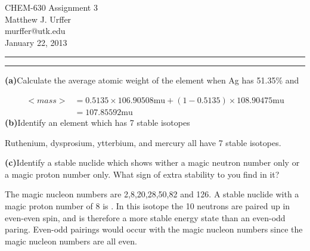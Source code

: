 \documentclass[11pt]{article}
\makeatletter
\newcommand{\question}[2] {\vspace{.25in} \hrule\vspace{0.5em}
\noindent{\bf #1: #2} \vspace{0.5em}
\hrule \vspace{.10in}}
\renewcommand{\part}[1] {\vspace{.10in} {\bf (#1)}}
\newcommand{\myname}{Matthew J. Urffer}
\newcommand{\myemail}{murffer@utk.edu}
\newcommand{\myhwnum}{3}
\makeatother
\begin{document}
\medskip                        %

\thispagestyle{plain}
\begin{center}                  %
{\Large CHEM-630 Assignment \myhwnum} \\
\myname \\
\myemail \\
January 22, 2013 \\
\end{center}

\question{1.11}{Atoms}

\part{a}{Calculate the average atomic weight of the element when Ag has 51.35\%  and }

\begin{align}
	<mass> &= 0.5135\times106.90508\text{mu} + (1-0.5135)\times108.90475\text{mu}\\
			 &= 107.85592\text{mu}
\end{align}
\part{b}{Identify an element which has 7 stable isotopes}

Ruthenium, dysprosium, ytterbium, and mercury all have 7 stable isotopes.

\part{c}{Identify a stable nuclide which shows wither a magic neutron number only or a magic proton number only. What sign of extra stability to you find in it?}

The magic nucleon numbers are 2,8,20,28,50,82 and 126.
A stable nuclide with a magic proton number of 8 is .  
In this isotope the 10 neutrons are paired up in even-even spin, and is therefore a more stable energy state than an even-odd paring.
Even-odd pairings would occur with the magic nucleon numbers since the magic nucleon numbers are all even.
\end{document}
